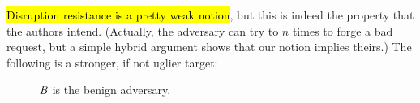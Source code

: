 \noindent\hl{Disruption resistance is a pretty weak notion}, but this is indeed
the property that the authors intend. (Actually, the adversary can try to $n$
times to forge a bad request, but a simple hybrid argument shows that our notion
implies theirs.) The following is a stronger, if not uglier target:
\begin{figure}[h]
  \caption{$\mathit{B}$ is the benign adversary.}
\end{figure}
